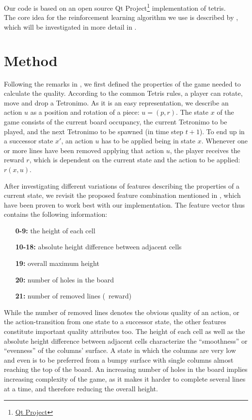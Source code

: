 \documentclass{ml}
\begin{document}
Our code is based on an open source Qt Project\footnote{\href{https://qt-project.org/doc/qt-4.8/widgets-tetrix.html}{Qt Project}} implementation of tetris. \\
The core idea for the reinforcement learning algorithm we use is described by \cite{zucker2009learning}, which will be investigated in more detail in .


\section{Method}
\label{method}

Following the remarks in \cite{zucker2009learning}, we first defined the properties of the game needed to calculate the quality.
According to the common Tetris rules, a player can rotate, move and drop a Tetronimo. As it is an easy representation, we describe an action $u$ as a position and rotation of a piece: $u = (p,r)$. The state $x$ of the game consists of the current board occupancy, the current Tetronimo to be played, and the next Tetronimo to be spawned (in time step $t+1$). 
To end up in a successor state $x'$, an action $u$ has to be applied being in state $x$. 
Whenever one or more lines have been removed applying that action $u$, the player receives the reward $r$, which is dependent on the current state and the action to be applied: $r(x,u)$.

After investigating different variations of features describing the properties of a current state, we revisit the proposed feature combination mentioned in \cite{zucker2009learning}, which have been proven to work best with our implementation. 
The feature vector thus contains the following information:
\begin{enumerate}
	\item[\textbf{0-9:}] the height of each cell
	\item[\textbf{10-18:}] absolute height difference between adjacent cells
	\item[\textbf{19:}] overall maximum height 
	\item[\textbf{20:}] number of holes in the board
	\item[\textbf{21:}] number of removed lines (\Corresponds~reward)
\end{enumerate}
While the number of removed lines denotes the obvious quality of an action, or the action-transition from one state to a successor state, the other features constitute important quality attributes too. 
The height of each cell as well as the absolute height difference between adjacent cells characterize the ``smoothness'' or ``evenness'' of the columns' surface. 
A state in which the columns are very low and even is to be preferred from a bumpy surface with single columns almost reaching the top of the board. 
An increasing number of holes in the board implies increasing complexity of the game, as it makes it harder to complete several lines at a time, and therefore reducing the overall height. 
\end{document}
